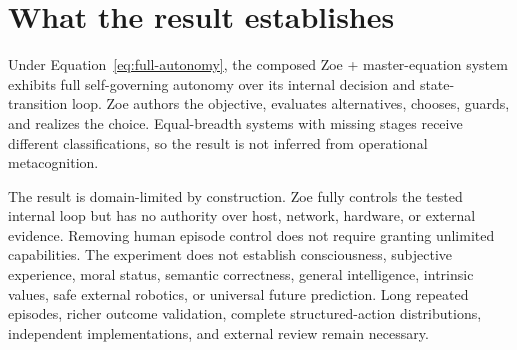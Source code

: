 \section{What the result establishes}
Under Equation~\eqref{eq:full-autonomy}, the composed Zoe + master-equation system exhibits full self-governing autonomy over its internal decision and state-transition loop. Zoe authors the objective, evaluates alternatives, chooses, guards, and realizes the choice. Equal-breadth systems with missing stages receive different classifications, so the result is not inferred from operational metacognition.

The result is domain-limited by construction. Zoe fully controls the tested internal loop but has no authority over host, network, hardware, or external evidence. Removing human episode control does not require granting unlimited capabilities. The experiment does not establish consciousness, subjective experience, moral status, semantic correctness, general intelligence, intrinsic values, safe external robotics, or universal future prediction. Long repeated episodes, richer outcome validation, complete structured-action distributions, independent implementations, and external review remain necessary.
